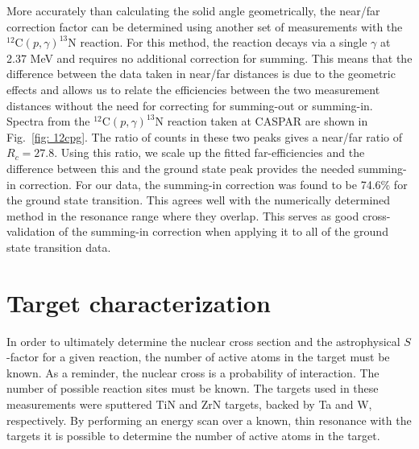 More accurately than calculating the solid angle geometrically, the near/far correction factor can be determined using another set of measurements with the $^{12}$C$\left( p,\gamma \right) ^{13}$N reaction. For this method, the reaction decays via a single $\gamma$ at 2.37 MeV and requires no additional correction for summing. This means that the difference between the data taken in near/far distances is due to the geometric effects and allows us to relate the efficiencies between the two measurement distances without the need for correcting for summing-out or summing-in. Spectra from the $^{12}$C$\left( p,\gamma \right) ^{13}$N reaction taken at CASPAR are shown in Fig.\ \ref{fig: 12cpg}. The ratio of counts in these two peaks gives a near/far ratio of $R_{c} = 27.8$. Using this ratio, we scale up the fitted far-efficiencies and the difference between this and the ground state peak provides the needed summing-in correction. For our data, the summing-in correction was found to be 74.6\% for the ground state transition. This agrees well with the numerically determined method in the resonance range where they overlap. This serves as good cross-validation of the summing-in correction when applying it to all of the ground state transition data.







\section{Target characterization}
\label{sec: targetCharacterization}

In order to ultimately determine the nuclear cross section and the astrophysical $S$-factor for a given reaction, the number of active atoms in the target must be known. As a reminder, the nuclear cross is a probability of interaction. The number of possible reaction sites must be known. The targets used in these measurements were sputtered TiN and ZrN targets, backed by Ta and W, respectively. By performing an energy scan over a known, thin resonance with the targets it is possible to determine the number of active atoms in the target. 

